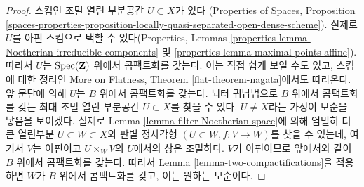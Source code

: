 \begin{proof}
\medskip\noindent
스킴인 조밀 열린 부분공간 $U \subset X$가 있다
(Properties of Spaces, Proposition
\ref{spaces-properties-proposition-locally-quasi-separated-open-dense-scheme}).
실제로 $U$를 아핀 스킴으로 택할 수 있다(Properties, Lemmas
\ref{properties-lemma-Noetherian-irreducible-components} 및
\ref{properties-lemma-maximal-points-affine}).
따라서 $U$는 $\mathop{\mathrm{Spec}}(\mathbf{Z})$ 위에서 콤팩트화를 갖는다.
이는 직접 쉽게 보일 수도 있고, 스킴에 대한 정리인 More on Flatness,
Theorem \ref{flat-theorem-nagata}에서도 따라온다.
앞 문단에 의해 $U$는 $B$ 위에서 콤팩트화를 갖는다.
뇌터 귀납법으로 $B$ 위에서 콤팩트화를 갖는 최대 조밀 열린
부분공간 $U \subset X$를 찾을 수 있다. $U \not = X$라는 가정이
모순을 낳음을 보이겠다. 실제로 Lemma
\ref{lemma-filter-Noetherian-space}에 의해 엄밀히 더 큰 열린부분
$U \subset W \subset X$와 판별 정사각형
$(U \subset W, f : V \to W)$를 찾을 수 있는데, 여기서 $V$는
아핀이고 $U \times_W V$의 $U$에서의 상은 조밀하다.
$V$가 아핀이므로 앞에서와 같이 $B$ 위에서 콤팩트화를 갖는다.
따라서 Lemma \ref{lemma-two-compactifications}을 적용하면 $W$가
$B$ 위에서 콤팩트화를 갖고, 이는 원하는 모순이다.
\end{proof}











